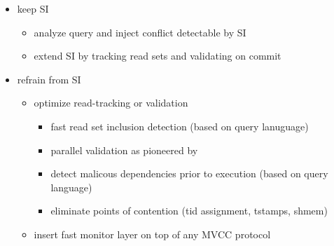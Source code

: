 \begin{itemize}
    \item keep SI
        \begin{itemize}
            \item analyze query and inject conflict detectable by SI \cite{fekete2005making}
            \item extend SI by tracking read sets and validating on commit \cite{fekete2005making, cahill2009serializable}
        \end{itemize}
    \item refrain from SI
        \begin{itemize}
            \item optimize read-tracking or validation
                \begin{itemize}
                    \item fast read set inclusion detection (based on query lanuguage) \cite{neumann2015fast}
                    \item parallel validation \cite{bailey2013exploring, ding2015centiman, faleiro2015rethinking} as pioneered by \cite{kung1981optimistic}
                    \item detect malicous dependencies prior to execution (based on query language) \cite{faleiro2015rethinking}
                    \item eliminate points of contention (tid assignment, tstamps, shmem) \cite{tu2013speedy, zhou2017posterior}
                \end{itemize}
            \item insert fast monitor layer on top of any MVCC protocol \cite{wang2017efficiently}
        \end{itemize}
\end{itemize}
